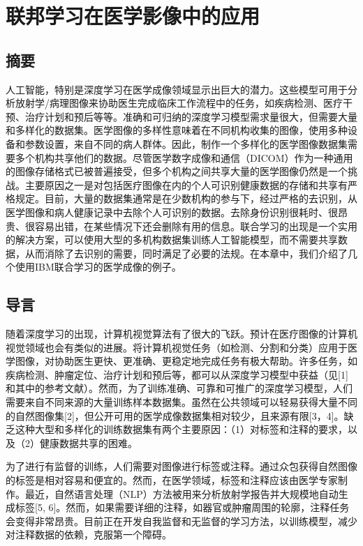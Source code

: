 \chapter{联邦学习在医学影像中的应用}

\section{摘要}
人工智能，特别是深度学习在医学成像领域显示出巨大的潜力。这些模型可用于分析放射学/病理图像来协助医生完成临床工作流程中的任务，如疾病检测、医疗干预、治疗计划和预后等等。准确和可归纳的深度学习模型需求量很大，但需要大量和多样化的数据集。医学图像的多样性意味着在不同机构收集的图像，使用多种设备和参数设置，来自不同的病人群体。因此，制作一个多样化的医学图像数据集需要多个机构共享他们的数据。尽管医学数字成像和通信（DICOM）作为一种通用的图像存储格式已被普遍接受，但多个机构之间共享大量的医学图像仍然是一个挑战。主要原因之一是对包括医疗图像在内的个人可识别健康数据的存储和共享有严格规定。目前，大量的数据集通常是在少数机构的参与下，经过严格的去识别，从医学图像和病人健康记录中去除个人可识别的数据。去除身份识别很耗时、很昂贵、很容易出错，在某些情况下还会删除有用的信息。联合学习的出现是一个实用的解决方案，可以使用大型的多机构数据集训练人工智能模型，而不需要共享数据，从而消除了去识别的需要，同时满足了必要的法规。在本章中，我们介绍了几个使用IBM联合学习的医学成像的例子。

\section{导言}
随着深度学习的出现，计算机视觉算法有了很大的飞跃。预计在医疗图像的计算机视觉领域也会有类似的进展。将计算机视觉任务（如检测、分割和分类）应用于医学图像，对协助医生更快、更准确、更稳定地完成任务有极大帮助。许多任务，如疾病检测、肿瘤定位、治疗计划和预后等，都可以从深度学习模型中获益（见[1]和其中的参考文献）。然而，为了训练准确、可靠和可推广的深度学习模型，人们需要来自不同来源的大量训练样本数据集。虽然在公共领域可以轻易获得大量不同的自然图像集[2]，但公开可用的医学成像数据集相对较少，且来源有限[3，4]。缺乏这种大型和多样化的训练数据集有两个主要原因：（1）对标签和注释的要求，以及（2）健康数据共享的困难。

为了进行有监督的训练，人们需要对图像进行标签或注释。通过众包获得自然图像的标签是相对容易和便宜的。然而，在医学领域，标签和注释应该由医学专家制作。最近，自然语言处理（NLP）方法被用来分析放射学报告并大规模地自动生成标签[5, 6]。然而，如果需要详细的注释，如器官或肿瘤周围的轮廓，注释任务会变得非常昂贵。目前正在开发自我监督和无监督的学习方法，以训练模型，减少对注释数据的依赖，克服第一个障碍。

